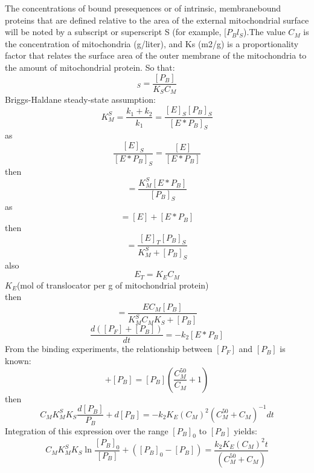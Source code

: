 \documentclass[UTF8]{ctexart}%
\begin{document}
The concentrations of bound presequences or of intrinsic, membranebound proteins that are defined relative to the area of the external mitochondrial surface will be noted by a subscript or superscript S (for example, $[P_Bl_S$).The value $C_M$ is the concentration of mitochondria (g/liter), and Ks (m2/g) is a proportionality factor that relates the surface area of the outer membrane of the mitochondria to the amount of mitochondrial protein. So that:
\begin{equation}
[P_B]_S=\frac{[P_B]}{K_S C_M}
\end{equation}
Briggs-Haldane steady-state assumption:
\begin{equation}
K_M^S=\frac{k_1+k_2}{k_1}=\frac{[E]_S [P_B]_S}{[E*P_B]_S}
\end{equation}
as
\begin{equation}
\frac{[E]_S}{[E*P_B]_S}=\frac{[E]}{[E*P_B]}
\end{equation}
then
\begin{equation}
[E]=\frac{K_M^S[E*P_B]}{[P_B]_S}
\end{equation}
as
\begin{equation}
[E_T]=[E]+[E*P_B]
\end{equation}
then
\begin{equation}
[E*P_B]=\frac{[E]_T[P_B]_S}{K_M^S+[P_B]_S}
\end{equation}
also
\begin{equation}
E_T=K_EC_M
\end{equation}
$K_E$(mol of translocator per g of mitochondrial protein) \\
then
\begin{equation}
[E*P_B]=\frac{EC_M[P_B]}{K_M^SC_MK_S+[P_B]}
\end{equation}
\begin{equation}
\frac{d([P_F]+[P_B])}{d t}=-k_2[E*P_B]
\end{equation}
From the binding experiments, the relationship between $[P_F]$ and $[P_B]$ is known:
\begin{equation}
[P_F]+[P_B]=[P_B](\frac{C_M^{50}}{C_M}+1)
\end{equation}
then
\begin{equation}
C_MK_M^SK_S \frac{d[P_B]}{P_B}+d[P_B]=-k_2K_E(C_M)^2(C_M^{50}+C_M)^{-1} d t
\end{equation}
Integration of this expression over the range $[P_B]_0$ to $[P_B]$ yields:
\begin{equation}
C_MK_M^SK_S\ln\frac{[P_B]_0}{[P_B]}+([P_B]_0-[P_B])=\frac{k_2K_E(C_M)^2 t}{(C_M^{50}+C_M)}
\end{equation}
\end{document}
